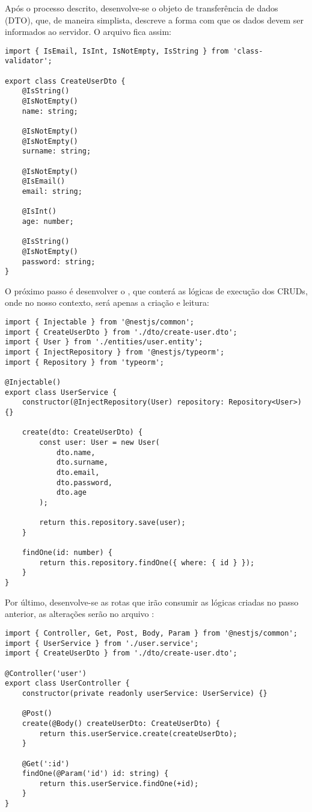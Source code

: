 Após o processo descrito, desenvolve-se o objeto de transferência de dados (DTO), que, de maneira simplista, descreve a forma com que os dados devem ser informados ao servidor. O arquivo  fica assim:
\begin{lstlisting}
import { IsEmail, IsInt, IsNotEmpty, IsString } from 'class-validator';

export class CreateUserDto {
    @IsString()
    @IsNotEmpty()
    name: string;

    @IsNotEmpty()
    @IsNotEmpty()
    surname: string;

    @IsNotEmpty()
    @IsEmail()
    email: string;

    @IsInt()
    age: number;

    @IsString()
    @IsNotEmpty()
    password: string;
}
\end{lstlisting}

O próximo passo é desenvolver o , que conterá as lógicas de execução dos CRUDs, onde no nosso contexto, será apenas a criação e leitura:
\begin{lstlisting}
import { Injectable } from '@nestjs/common';
import { CreateUserDto } from './dto/create-user.dto';
import { User } from './entities/user.entity';
import { InjectRepository } from '@nestjs/typeorm';
import { Repository } from 'typeorm';

@Injectable()
export class UserService {
    constructor(@InjectRepository(User) repository: Repository<User>) {}

    create(dto: CreateUserDto) {
        const user: User = new User(
            dto.name,
            dto.surname,
            dto.email,
            dto.password,
            dto.age
        );

        return this.repository.save(user);
    }

    findOne(id: number) {
        return this.repository.findOne({ where: { id } });
    }
}
\end{lstlisting}

Por último, desenvolve-se as rotas que irão consumir as lógicas criadas no passo anterior, as alterações serão no arquivo :
\begin{lstlisting}
import { Controller, Get, Post, Body, Param } from '@nestjs/common';
import { UserService } from './user.service';
import { CreateUserDto } from './dto/create-user.dto';

@Controller('user')
export class UserController {
    constructor(private readonly userService: UserService) {}

    @Post()
    create(@Body() createUserDto: CreateUserDto) {
        return this.userService.create(createUserDto);
    }

    @Get(':id')
    findOne(@Param('id') id: string) {
        return this.userService.findOne(+id);
    }
}
\end{lstlisting}

